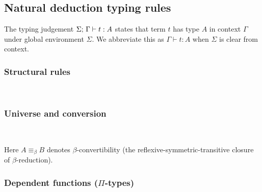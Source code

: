 \subsection{Natural deduction typing rules}

The typing judgement $\Sigma;\,\Gamma \vdash t : A$ states that term $t$ has type $A$ in context $\Gamma$ under global environment $\Sigma$. We abbreviate this as $\Gamma \vdash t : A$ when $\Sigma$ is clear from context.

\subsubsection{Structural rules}

\begin{Rules}
\\[1.5em]
\end{Rules}

\subsubsection{Universe and conversion}

\begin{Rules}
\\[1.5em]
\end{Rules}

\noindent Here $A \equiv_\beta B$ denotes $\beta$-convertibility (the reflexive-symmetric-transitive closure of $\beta$-reduction).

\subsubsection{Dependent functions ($\Pi$-types)}

\begin{Rules}
\\[1.5em]
\\[1.5em]
\end{Rules}

